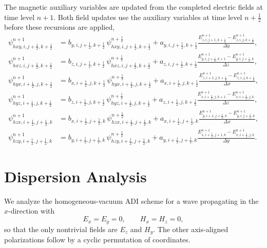 \documentclass{article}
\numberwithin{equation}{section}
\numberwithin{figure}{section}
\begin{document}
The magnetic auxiliary variables are updated from the completed electric fields at time level $n+1$. Both field updates use the auxiliary variables at time level $n+\tfrac12$ before these recursions are applied,
\begin{subequations}\label{eq:second-pml-aux-h}
    \begin{align}
        \psi_{hxy,i,j+\tfrac12,k+\tfrac12}^{n+1} & = b_{y,i,j+\tfrac12,k+\tfrac12}\,\psi_{hxy,i,j+\tfrac12,k+\tfrac12}^{n+\frac12} +a_{y,i,j+\tfrac12,k+\tfrac12} \frac{E_{z,i,j+1,k+\tfrac12}^{n+1}-E_{z,i,j,k+\tfrac12}^{n+1}}{\Delta y}, \\
        \psi_{hxz,i,j+\tfrac12,k+\tfrac12}^{n+1} & = b_{z,i,j+\tfrac12,k+\tfrac12}\,\psi_{hxz,i,j+\tfrac12,k+\tfrac12}^{n+\frac12} +a_{z,i,j+\tfrac12,k+\tfrac12} \frac{E_{y,i,j+\tfrac12,k+1}^{n+1}-E_{y,i,j+\tfrac12,k}^{n+1}}{\Delta z}, \\
        \psi_{hyx,i+\tfrac12,j,k+\tfrac12}^{n+1} & = b_{x,i+\tfrac12,j,k+\tfrac12}\,\psi_{hyx,i+\tfrac12,j,k+\tfrac12}^{n+\frac12} +a_{x,i+\tfrac12,j,k+\tfrac12} \frac{E_{z,i+1,j,k+\tfrac12}^{n+1}-E_{z,i,j,k+\tfrac12}^{n+1}}{\Delta x}, \\
        \psi_{hyz,i+\tfrac12,j,k+\tfrac12}^{n+1} & = b_{z,i+\tfrac12,j,k+\tfrac12}\,\psi_{hyz,i+\tfrac12,j,k+\tfrac12}^{n+\frac12} +a_{z,i+\tfrac12,j,k+\tfrac12} \frac{E_{x,i+\tfrac12,j,k+1}^{n+1}-E_{x,i+\tfrac12,j,k}^{n+1}}{\Delta z}, \\
        \psi_{hzx,i+\tfrac12,j+\tfrac12,k}^{n+1} & = b_{x,i+\tfrac12,j+\tfrac12,k}\,\psi_{hzx,i+\tfrac12,j+\tfrac12,k}^{n+\frac12} +a_{x,i+\tfrac12,j+\tfrac12,k} \frac{E_{y,i+1,j+\tfrac12,k}^{n+1}-E_{y,i,j+\tfrac12,k}^{n+1}}{\Delta x}, \\
        \psi_{hzy,i+\tfrac12,j+\tfrac12,k}^{n+1} & = b_{y,i+\tfrac12,j+\tfrac12,k}\,\psi_{hzy,i+\tfrac12,j+\tfrac12,k}^{n+\frac12} +a_{y,i+\tfrac12,j+\tfrac12,k} \frac{E_{x,i+\tfrac12,j+1,k}^{n+1}-E_{x,i+\tfrac12,j,k}^{n+1}}{\Delta y}.
    \end{align}
\end{subequations}


\section{Dispersion Analysis}

We analyze the homogeneous-vacuum ADI scheme for a wave propagating in the $x$-direction with
\begin{equation}
    E_x=E_y=0,\qquad H_x=H_z=0,
\end{equation}
so that the only nontrivial fields are $E_z$ and $H_y$. The other axis-aligned polarizations follow by a cyclic permutation of coordinates.
\end{document}
